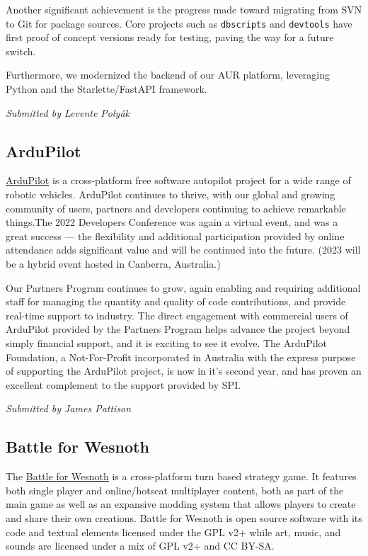 \documentclass[a4paper]{report}
\begin{document}
Another significant achievement is the progress made toward migrating from SVN to Git for package sources. Core projects such as {\tt dbscripts} and {\tt devtools} have first proof of concept versions ready for testing, paving the way for a future switch.

Furthermore, we modernized the backend of our AUR platform, leveraging Python and the Starlette/FastAPI framework.

{\em Submitted by Levente Polyák}

\subsection{ArduPilot}

\href{https://ardupilot.org/}{ArduPilot} is a cross-platform free software autopilot project for a wide range of robotic vehicles. ArduPilot continues to thrive, with our global and growing community of users, partners and developers continuing to achieve remarkable things.The 2022 Developers Conference was again a virtual event, and was a great success --- the flexibility and additional participation provided by online attendance adds significant value and will be continued into the future. (2023 will be a hybrid event hosted in Canberra, Australia.)

Our Partners Program continues to grow, again enabling and requiring additional staff for managing the quantity and quality of code contributions, and provide real-time support to industry. The direct engagement with commercial users of ArduPilot provided by the Partners Program helps advance the project beyond simply financial support, and it is exciting to see it evolve.  The ArduPilot Foundation, a Not-For-Profit incorporated in Australia with the express purpose of supporting the ArduPilot project, is now in it's second year, and has proven an excellent complement to the support provided by SPI.

{\em Submitted by James Pattison}

\subsection{Battle for Wesnoth}

The \href{https://www.wesnoth.org/}{Battle for Wesnoth} is a cross-platform turn based strategy game. It features both single player and online/hotseat multiplayer content, both as part of the main game as well as an expansive modding system that allows players to create and share their own creations. Battle for Wesnoth is open source software with its code and textual elements licensed under the GPL v2+ while art, music, and sounds are licensed under a mix of GPL v2+ and CC BY-SA.
\end{document}

